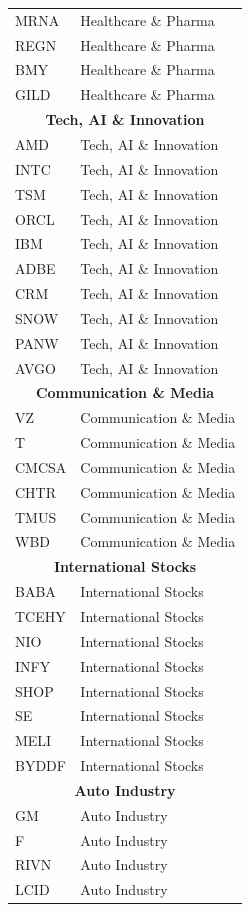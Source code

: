 \begin{longtable}{ll}
MRNA & Healthcare \& Pharma \\
REGN & Healthcare \& Pharma \\
BMY  & Healthcare \& Pharma \\
GILD & Healthcare \& Pharma \\
\multicolumn{2}{c}{\textbf{Tech, AI \& Innovation}} \\
AMD  & Tech, AI \& Innovation \\
INTC & Tech, AI \& Innovation \\
TSM  & Tech, AI \& Innovation \\
ORCL & Tech, AI \& Innovation \\
IBM  & Tech, AI \& Innovation \\
ADBE & Tech, AI \& Innovation \\
CRM  & Tech, AI \& Innovation \\
SNOW & Tech, AI \& Innovation \\
PANW & Tech, AI \& Innovation \\
AVGO & Tech, AI \& Innovation \\
\multicolumn{2}{c}{\textbf{Communication \& Media}} \\
VZ    & Communication \& Media \\
T     & Communication \& Media \\
CMCSA & Communication \& Media \\
CHTR  & Communication \& Media \\
TMUS  & Communication \& Media \\
WBD   & Communication \& Media \\
\multicolumn{2}{c}{\textbf{International Stocks}} \\
BABA  & International Stocks \\
TCEHY & International Stocks \\
NIO   & International Stocks \\
INFY  & International Stocks \\
SHOP  & International Stocks \\
SE    & International Stocks \\
MELI  & International Stocks \\
BYDDF & International Stocks \\
\multicolumn{2}{c}{\textbf{Auto Industry}} \\
GM   & Auto Industry \\
F    & Auto Industry \\
RIVN & Auto Industry \\
LCID & Auto Industry \\

\end{longtable}
